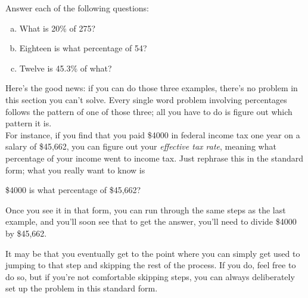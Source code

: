 \begin{try}
Answer each of the following questions:
\begin{enumerate}[(a)]
\item What is 20\% of 275?
\item Eighteen is what percentage of 54?
\item Twelve is 45.3\% of what?
\end{enumerate}
\end{try}

Here's the good news: if you can do those three examples, there's no problem in this section you can't solve.  Every single word problem involving percentages follows the pattern of one of those three; all you have to do is figure out which pattern it is.\\

For instance, if you find that you paid \$4000 in federal income tax one year on a salary of \$45,662, you can figure out your \emph{effective tax rate}, meaning what percentage of your income went to income tax.  Just rephrase this in the standard form; what you really want to know is
\begin{center}
\$4000 is what percentage of \$45,662?
\end{center}
Once you see it in that form, you can run through the same steps as the last example, and you'll soon see that to get the answer, you'll need to divide \$4000 by \$45,662.

It may be that you eventually get to the point where you can simply get used to jumping to that step and skipping the rest of the process.  If you do, feel free to do so, but if you're not comfortable skipping steps, you can always deliberately set up the problem in this standard form.
\vfill
\pagebreak

